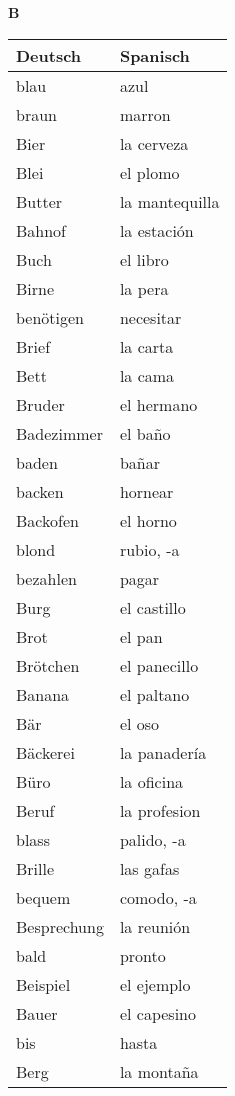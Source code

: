 \begin{flushright}\begin{Huge}\textbf{B}\end{Huge}\end{flushright}

\begin{longtable}{p{} p{}} 
\textbf{Deutsch}     & \textbf{Spanisch}                                       \\ \hline
\hline
\endhead %
blau & azul \\
braun & marron \\
Bier & la cerveza\\
Blei & el plomo \\
Butter & la mantequilla \\
Bahnof & la estación \\
Buch & el libro \\
Birne & la pera\\
benötigen & necesitar\\
Brief & la carta\\
Bett & la cama \\
Bruder & el hermano\\
Badezimmer & el baño\\
baden & bañar\\
backen & hornear\\
Backofen & el horno\\
blond & rubio, -a\\
bezahlen & pagar\\
Burg & el castillo\\
Brot & el pan\\
Brötchen & el panecillo\\
Banana & el paltano\\
Bär & el oso\\
Bäckerei & la panadería\\
Büro & la oficina\\
Beruf & la profesion\\
blass & palido, -a\\
Brille & las gafas\\
bequem & comodo, -a\\
Besprechung & la reunión\\
bald & pronto\\
Beispiel & el ejemplo \\
Bauer & el capesino \\
bis & hasta \\
Berg & la montaña \\
\end{longtable}
